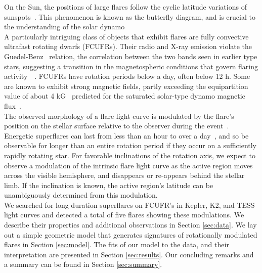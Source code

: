\documentclass[fleqn,usenatbib,letters]{mnras}%
\begin{document}
On the Sun, the positions of large flares follow the cyclic latitude variations of sunspots~\citep{zhang2007}. This phenomenon is known as the butterfly diagram, and is crucial to the understanding of the solar dynamo~\citep{gnevyshev1977}%
\\
A particularly intriguing class of objects that exhibit flares are fully convective ultrafast rotating dwarfs (FCUFRs). Their radio and X-ray emission violate the Guedel-Benz~\citep{guedel1993, benz1994} relation, the correlation between the two bands seen in earlier type stars, suggesting a transition in the magnetospheric conditions that govern flaring activity~~\citep{berger2010, mclean2012, cook2014, williams2014}. FCUFRs have rotation periods below a day, often below 12 h. Some are known to exhibit strong magnetic fields, partly exceeding the equipartition value of about 4 kG~\citep{shulyak2017} predicted for the saturated solar-type dynamo magnetic flux~\citep{pevtsov2003}. %
\\
The observed morphology of a flare light curve is modulated by the flare's position on the stellar surface relative to the observer during the event~\citep{tovmassian2003}. Energetic superflares can last from less than an hour to over a day~\citep{kowalski2013,paudel2018b}, and so be observable for longer than an entire rotation period if they occur on a sufficiently rapidly rotating star. For favorable inclinations of the rotation axis, we expect to observe a modulation of the intrinsic flare light curve as the active region moves across the visible hemisphere, and disappears or re-appears behind the stellar limb. If the inclination is known, the active region's latitude can be unambiguously determined from this modulation.
\\
We searched for long duration superflares on FCUFR's in Kepler, K2, and TESS light curves and detected a total of five flares showing these modulations. We describe their properties and additional observations in Section \ref{sec:data}. We lay out a simple geometric model that generates signatures of rotationally modulated flares in Section \ref{sec:model}. The fits of our model to the data, and their interpretation are presented in Section \ref{sec:results}. Our concluding remarks and a summary can be found in Section \ref{sec:summary}.
\end{document}
